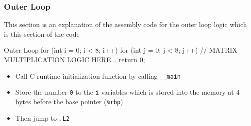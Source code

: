 \documentclass[12pt, a4paper]{article}
\begin{document}
    \pagebreak

            \subsubsection{Outer Loop}
                This section is an explanation of the assembly code for the outer loop logic which is this section of the code
                \begin{codeblock}[minted language=c]{Outer Loop}
                    for (int i = 0; i < 8; i++) {
                        for (int j = 0; j < 8; j++) {
                            // MATRIX MULTIPLICATION LOGIC HERE...
                        }
                    }
                    return 0;
                \end{codeblock}

                \begin{itemize}
                    \item Call C runtime initialization function by calling \texttt{\_\_main}
                    \item Store the number \texttt{0} to the \texttt{i} variables which is stored into the
                    memory at 4 bytes before the base pointer (\texttt{\%rbp})
                    \item Then jump to \texttt{.L2}
                \end{itemize}
\end{document}

